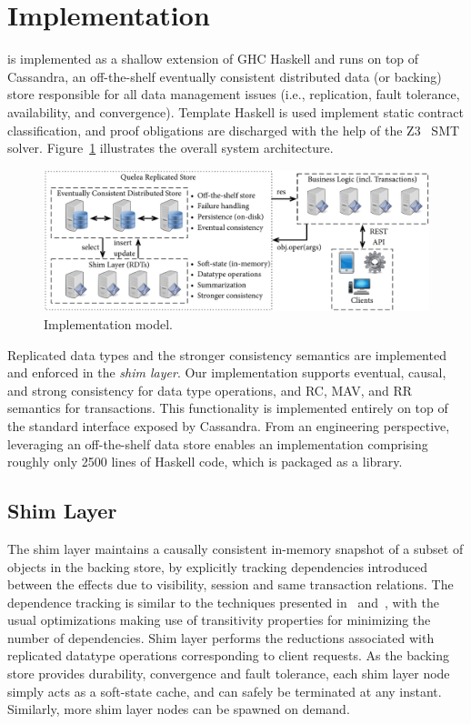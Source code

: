 \section{Implementation}
\label{q_sec:impl}

\quelea is implemented as a shallow extension of GHC Haskell and runs on top of
Cassandra, an off-the-shelf eventually consistent distributed data (or backing)
store responsible for all data management issues (i.e., replication, fault
tolerance, availability, and convergence).  Template Haskell is used implement
static contract classification, and proof obligations are discharged with the
help of the Z3~\cite{Z3} SMT solver. Figure~\ref{fig:impl_mod} illustrates the
overall system architecture.

\begin{figure}[t]
\begin{center}
\includegraphics[width=\columnwidth]{Figures/ImplModel}
\end{center}
\caption{Implementation model.}
\label{fig:impl_mod}
\end{figure}

Replicated data types and the stronger consistency semantics are implemented
and enforced in the \emph{shim layer}. Our implementation supports eventual,
causal, and strong consistency for data type operations, and RC, MAV, and RR
semantics for transactions.  This functionality is implemented entirely on top
of the standard interface exposed by Cassandra. From an engineering
perspective, leveraging an off-the-shelf data store enables an implementation
comprising roughly only 2500 lines of Haskell code, which is packaged as a
library.

\subsection{Shim Layer}

The shim layer maintains a causally consistent in-memory snapshot of a subset
of objects in the backing store, by explicitly tracking dependencies introduced
between the effects due to visibility, session and same transaction relations.
The dependence tracking is similar to the techniques presented in~\cite{BoltOn}
and~\cite{Eiger}, with the usual optimizations making use of transitivity
properties for minimizing the number of dependencies. Shim layer performs the
reductions associated with replicated datatype operations corresponding to
client requests. As the backing store provides durability, convergence and
fault tolerance, each shim layer node simply acts as a soft-state cache, and
can safely be terminated at any instant. Similarly, more shim layer nodes can
be spawned on demand.


